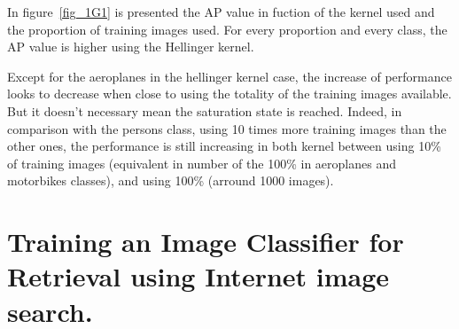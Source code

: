 \documentclass{article}
\begin{document}
In figure~\ref{fig_1G1} is presented the AP value in fuction of the kernel used and the proportion of training images used. For every proportion and every class, the AP value is higher using the Hellinger kernel.


Except for the aeroplanes in the hellinger kernel case, the increase of performance looks to decrease when close to using the totality of the training images available. But it doesn't necessary mean the saturation state is reached. Indeed, in comparison with the persons class, using 10 times more training images than the other ones, the performance is still increasing in both kernel between using 10\% of training images (equivalent in number of the 100\% in aeroplanes and motorbikes classes), and using 100\% (arround 1000 images).

\clearpage

\part{Training an Image Classifier for Retrieval using Internet image search.}
\end{document}
